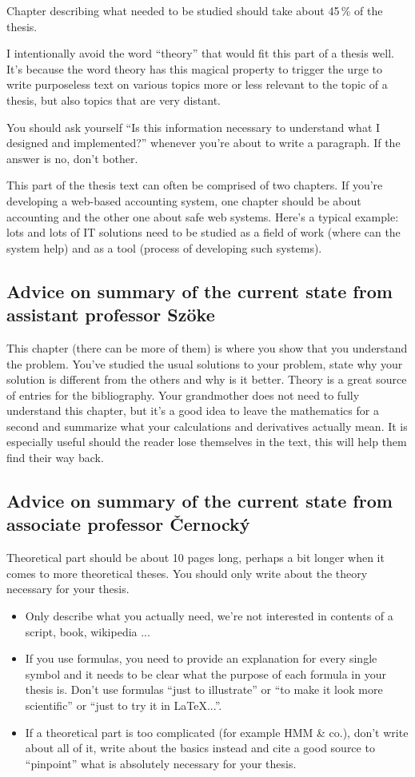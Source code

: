 {{Chapter describing what needed to be studied should take about 45\,\% of the thesis.

I intentionally avoid the word ``theory'' that would fit this part of a thesis well. It's because the word theory has this magical property to trigger the urge to write purposeless text on various topics more or less relevant to the topic of a thesis, but also topics that are very distant.

You should ask yourself ``Is this information necessary to understand what I designed and implemented?'' whenever you're about to write a paragraph. If the answer is no, don't bother.

This part of the thesis text can often be comprised of two chapters. If you're developing a web-based accounting system, one chapter should be about accounting and the other one about safe web systems. Here's a typical example: lots and lots of IT solutions need to be studied as a field of work (where can the system help) and as a tool (process of developing such systems).


\subsection*{Advice on summary of the current state from assistant professor Szöke}

This chapter (there can be more of them) is where you show that you understand the problem. You've studied the usual solutions to your problem, state why your solution is different from the others and why is it better. Theory is a great source of entries for the bibliography. Your grandmother does not need to fully understand this chapter, but it's a good idea to leave the mathematics for a second and summarize what your calculations and derivatives actually mean. It is especially useful should the reader lose themselves in the text, this will help them find their way back.

\subsection*{Advice on summary of the current state from associate professor Černocký}

Theoretical part should be about 10 pages long, perhaps a bit longer when it comes to more theoretical theses. You should only write about the theory necessary for your thesis.
\begin{itemize}
  \item{Only describe what you actually need, we're not interested in contents of a script, book, wikipedia ...}
  \item{If you use formulas, you need to provide an explanation for every single symbol and it needs to be clear what the purpose of each formula in your thesis is. Don't use formulas ``just to illustrate'' or ``to make it look more scientific'' or ``just to try it in LaTeX...''. }
  \item{If a theoretical part is too complicated (for example HMM \& co.), don't write about all of it, write about the basics instead and cite a good source to ``pinpoint'' what is absolutely necessary for your thesis.}
\end{itemize}


}}
